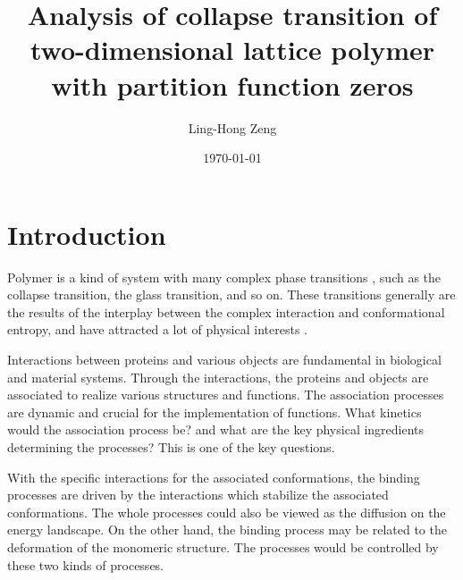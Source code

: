 \documentclass[preprint,preprintnumbers,amsmath,amssymb,showpacs,aps,pre]{revtex4-1}
\begin{document}
\title{Analysis of collapse transition of two-dimensional lattice
polymer with partition function zeros}
\author{Ling-Hong Zeng}


\date{\today}

\begin{abstract}

\end{abstract}


\maketitle

\section{Introduction}

Polymer is a kind of system with many complex phase transitions
\cite{LifshitzRMP78}, such as the collapse transition\cite{FloryJCP49,
FloryBOOK67,WilliamsARPC81}, the glass transition\cite{GibbsJCP58,
JackleRPP86}, and so on. These transitions generally are the results
of the interplay between the complex interaction and conformational
entropy, and have attracted a lot of physical interests
\cite{LifshitzRMP78,FloryJCP49,FloryBOOK67,WilliamsARPC81,GibbsJCP58,
JackleRPP86,deGennesBook79,StephenPLA75,RigByJCP1987,BellRMP93,
ChengARMR,PrivmanBook81,ZivPCCP09,ChengBook08}.

Interactions between proteins and various objects are fundamental
in biological and material systems. Through the interactions, the
proteins and objects are associated to realize various structures
and functions. The association processes are dynamic and crucial
for the implementation of functions. What kinetics would the association
process be? and what are the key physical ingredients determining
the processes? This is one of the key questions.

With the specific interactions for the associated conformations,
the binding processes are driven by the interactions which
stabilize the associated conformations. The whole processes could
also be viewed as the diffusion on the energy landscape. On the
other hand, the binding process may be related to the deformation
of the monomeric structure. The processes would be controlled by
these two kinds of processes.
\end{document}
